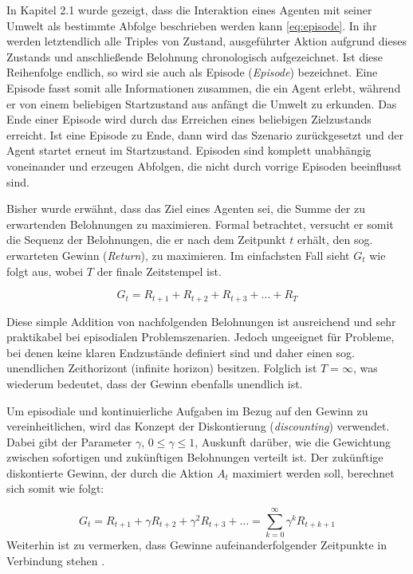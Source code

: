 In Kapitel 2.1 wurde gezeigt, dass die Interaktion eines Agenten mit seiner Umwelt als bestimmte Abfolge beschrieben werden kann \eqref{eq:episode}. In ihr werden letztendlich alle Triples von Zustand, ausgeführter Aktion aufgrund dieses Zustands und anschließende Belohnung chronologisch aufgezeichnet. Ist diese Reihenfolge endlich, so wird sie auch als Episode (\textit{Episode}) bezeichnet. Eine Episode fasst somit alle Informationen zusammen, die ein Agent erlebt, während er von einem beliebigen Startzustand aus anfängt die Umwelt zu erkunden. Das Ende einer Episode wird durch das Erreichen eines beliebigen Zielzustands erreicht. Ist eine Episode zu Ende, dann wird das Szenario zurückgesetzt und der Agent startet erneut im Startzustand. Episoden sind komplett unabhängig voneinander und erzeugen Abfolgen, die nicht durch vorrige Episoden beeinflusst sind.
\par
Bisher wurde erwähnt, dass das Ziel eines Agenten sei, die Summe der zu erwartenden Belohnungen zu maximieren. Formal betrachtet, versucht er somit die Sequenz der Belohnungen, die er nach dem Zeitpunkt $t$ erhält, den sog. erwarteten Gewinn (\textit{Return}), zu maximieren. Im einfachsten Fall sieht $G_t$ wie folgt aus, wobei $T$ der finale Zeitstempel ist.

\begin{equation}\label{eq:simpleReturn}
    G_t = R_{t+1} + R_{t+2} + R_{t+3} + \dots + R_{T}
\end{equation}

Diese simple Addition von nachfolgenden Belohnungen ist ausreichend und sehr praktikabel bei episodialen Problemszenarien. Jedoch ungeeignet für Probleme, bei denen keine klaren Endzustände definiert sind und daher einen sog. unendlichen Zeithorizont (infinite horizon) besitzen. Folglich ist  $T=\infty$, was wiederum bedeutet, dass der Gewinn ebenfalls unendlich ist. 
\par 
Um episodiale und kontinuierliche Aufgaben im Bezug auf den Gewinn zu vereinheitlichen, wird das Konzept der Diskontierung (\textit{discounting}) verwendet. Dabei gibt der Parameter $\gamma$, $0\leq \gamma \leq 1$, Auskunft darüber, wie die Gewichtung zwischen sofortigen und zukünftigen Belohnungen verteilt ist. Der zukünftige diskontierte Gewinn, der durch die Aktion $A_t$ maximiert werden soll, berechnet sich somit wie folgt\cite[S.55]{Sutton1998}:

\begin{equation}\label{eq:discountedReturn}
    G_t = R_{t+1} + \gamma R_{t+2} + \gamma^2 R_{t+3} + \dots  = \sum_{k=0}^\infty{\gamma^k R_{t+k+1}}
\end{equation}
Weiterhin ist zu vermerken, dass Gewinne aufeinanderfolgender Zeitpunkte in Verbindung stehen \cite[S.55]{Sutton1998}.

